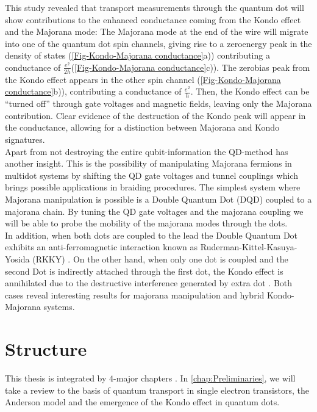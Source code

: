 This study revealed that transport measurements
through the quantum dot will show contributions to the enhanced conductance
coming from the Kondo effect and the Majorana mode: The Majorana mode
at the end of the wire will migrate into one of the quantum dot spin channels,
giving rise to a zero\textendash energy peak in the density of states
(\ref{Fig-Kondo-Majorana conductance}a)) contributing a conductance
of $\frac{e^{2}}{2h}$(\ref{Fig-Kondo-Majorana conductance}c)). The
zero\textendash bias peak from the Kondo effect appears in the other
spin channel (\ref{Fig-Kondo-Majorana conductance}b)), contributing
a conductance of $\frac{e^{2}}{h}$. Then, the Kondo effect can be
\textquotedblleft turned off\textquotedblright{} through gate voltages
and magnetic fields, leaving only the Majorana contribution. Clear
evidence of the destruction of the Kondo peak will appear in the conductance,
allowing for a distinction between Majorana and Kondo signatures.\\



 Apart from not destroying the entire qubit-information the QD-method has another insight.  This is the possibility of manipulating  Majorana fermions  in multidot systems by shifting the QD gate voltages and tunnel couplings which brings possible applications in  braiding procedures. The simplest system where Majorana manipulation is possible is  a  Double Quantum Dot (DQD) coupled to a majorana chain. By tuning the QD gate voltages and the majorana coupling we will be able to probe the mobility of the majorana modes through the dots. \\
 
In addition, when both dots are coupled to the lead the Double Quantum Dot exhibits an anti-ferromagnetic interaction known as  Ruderman-Kittel-Kasuya-Yosida (RKKY) \cite{ruderman_indirect_1954,kasuya_theory_1956,yosida_magnetic_1957}. On the other hand, when only one dot is coupled  and the second Dot is indirectly attached through the first dot,  the Kondo effect is annihilated due to the destructive interference  generated by extra dot \cite{dias_da_silva_transmission_2008}. Both cases reveal interesting results for majorana manipulation and hybrid Kondo-Majorana systems.


\section{Structure}

This thesis is integrated by $4$-major chapters . In  \ref{chap:Preliminaries}, we will take a review to the basis of quantum transport in single electron transistors, the Anderson model and the emergence of the Kondo effect in quantum dots. 

